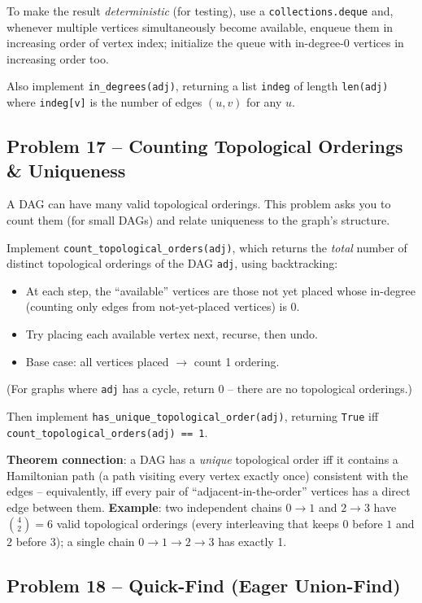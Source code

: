 \documentclass[11pt]{article}
\begin{document}
To make the result \emph{deterministic} (for testing), use a \texttt{collections.deque}
and, whenever multiple vertices simultaneously become available, enqueue them in
increasing order of vertex index; initialize the queue with in-degree-0 vertices in
increasing order too.

Also implement \texttt{in\_degrees(adj)}, returning a list \texttt{indeg} of length
\texttt{len(adj)} where \texttt{indeg[v]} is the number of edges $(u,v)$ for any $u$.

\subsection*{Problem 17 -- Counting Topological Orderings \& Uniqueness}

A DAG can have many valid topological orderings. This problem asks you to count them (for
small DAGs) and relate uniqueness to the graph's structure.

Implement \texttt{count\_topological\_orders(adj)}, which returns the \emph{total} number
of distinct topological orderings of the DAG \texttt{adj}, using backtracking:
\begin{itemize}
    \item At each step, the ``available'' vertices are those not yet placed whose
    in-degree (counting only edges from not-yet-placed vertices) is 0.
    \item Try placing each available vertex next, recurse, then undo.
    \item Base case: all vertices placed $\to$ count 1 ordering.
\end{itemize}
(For graphs where \texttt{adj} has a cycle, return 0 -- there are no topological
orderings.)

Then implement \texttt{has\_unique\_topological\_order(adj)}, returning \texttt{True} iff
\texttt{count\_topological\_orders(adj) == 1}.

\textbf{Theorem connection}: a DAG has a \emph{unique} topological order iff it contains a
Hamiltonian path (a path visiting every vertex exactly once) consistent with the edges --
equivalently, iff every pair of ``adjacent-in-the-order'' vertices has a direct edge
between them. \textbf{Example}: two independent chains $0\to1$ and $2\to3$ have $\binom{4}{2}
= 6$ valid topological orderings (every interleaving that keeps $0$ before $1$ and $2$
before $3$); a single chain $0\to1\to2\to3$ has exactly 1.

\subsection*{Problem 18 -- Quick-Find (Eager Union-Find)}
\end{document}
